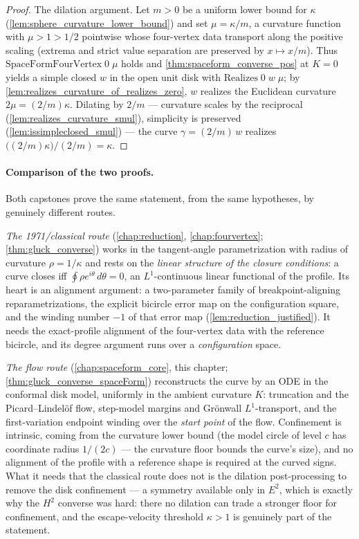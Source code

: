 \begin{proof}
  \leanok
  The dilation argument. Let $m>0$ be a uniform lower bound for $\kappa$
  (\cref{lem:sphere_curvature_lower_bound}) and set $\mu=\kappa/m$, a
  curvature function with $\mu>1>1/2$ pointwise whose four-vertex data
  transport along the positive scaling (extrema and strict value separation
  are preserved by $x\mapsto x/m$). Thus
  $\mathrm{SpaceFormFourVertex}\;0\;\mu$ holds and
  \cref{thm:spaceform_converse_pos} at $K=0$ yields a simple closed $w$ in the
  open unit disk with $\mathrm{Realizes}\;0\;w\;\mu$; by
  \cref{lem:realizes_curvature_of_realizes_zero}, $w$ realizes the Euclidean
  curvature $2\mu=(2/m)\kappa$. Dilating by $2/m$ — curvature scales by the
  reciprocal (\cref{lem:realizes_curvature_smul}), simplicity is preserved
  (\cref{lem:issimpleclosed_smul}) — the curve $\gamma=(2/m)\,w$ realizes
  $\bigl((2/m)\kappa\bigr)\big/(2/m)=\kappa$.
\end{proof}

\paragraph{Comparison of the two proofs.} Both capstones prove the same
statement, from the same hypotheses, by genuinely different routes.

\emph{The 1971/classical route} (\cref{chap:reduction},
\cref{chap:fourvertex}; \cref{thm:gluck_converse}) works in the tangent-angle
parametrization with radius of curvature $\rho=1/\kappa$ and rests on the
\emph{linear structure of the closure conditions}: a curve closes iff
$\oint\rho e^{i\theta}\,d\theta=0$, an $L^1$-continuous linear functional of
the profile. Its heart is an alignment argument: a two-parameter family of
breakpoint-aligning reparametrizations, the explicit bicircle error map on the
configuration square, and the winding number $-1$ of that error map
(\cref{lem:reduction_justified}). It needs the exact-profile alignment of the
four-vertex data with the reference bicircle, and its degree argument runs
over a \emph{configuration} space.

\emph{The flow route} (\cref{chap:spaceform_core}, this chapter;
\cref{thm:gluck_converse_spaceForm}) reconstructs the curve by an ODE in the
conformal disk model, uniformly in the ambient curvature $K$:
truncation and the Picard--Lindel\"of flow, step-model margins and Gr\"onwall
$L^1$-transport, and the first-variation endpoint winding over the
\emph{start point} of the flow. Confinement is intrinsic, coming from the
curvature lower bound (the model circle of level $c$ has coordinate radius
$1/(2c)$ — the curvature floor bounds the curve's size), and no alignment of
the profile with a reference shape is required at the curved signs. What it
needs that the classical route does not is the dilation post-processing to
remove the disk confinement — a symmetry available only in $E^2$, which is
exactly why the $H^2$ converse was hard: there no dilation can trade a
stronger floor for confinement, and the escape-velocity threshold $\kappa>1$
is genuinely part of the statement.

